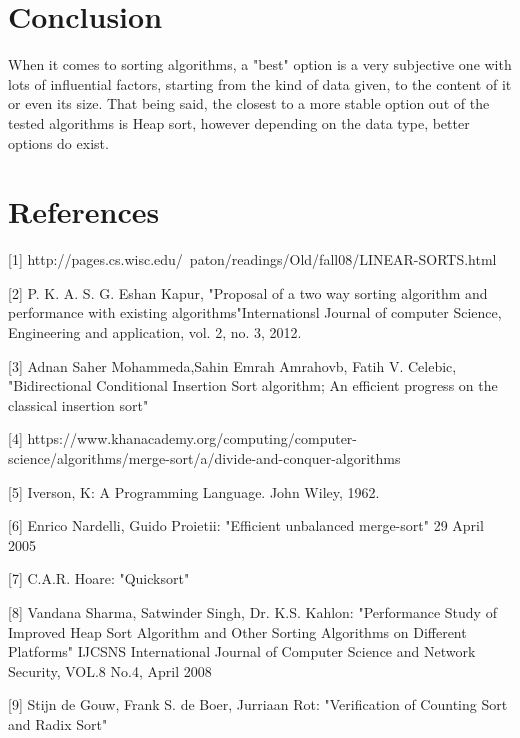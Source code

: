 \documentclass{article}
\begin{document}
\clearpage
\section{Conclusion}
When it comes to sorting algorithms, a "best" option is a very subjective one with lots of influential factors, starting from the kind of data given, to the content of it or even its size. That being said, the closest to a more stable option out of the tested algorithms is Heap sort, however depending on the data type, better options do exist.

\section{References}
[1] http://pages.cs.wisc.edu/~paton/readings/Old/fall08/LINEAR-SORTS.html


[2] P. K. A. S. G. Eshan Kapur, "Proposal of a two way sorting algorithm and performance with existing algorithms"Internationsl Journal of computer Science, Engineering and application, vol. 2, no. 3, 2012.


[3] Adnan Saher Mohammeda,Sahin Emrah Amrahovb, Fatih V. Celebic, "Bidirectional Conditional Insertion Sort algorithm; An efficient progress on the classical insertion sort"


[4] https://www.khanacademy.org/computing/computer-science/algorithms/merge-sort/a/divide-and-conquer-algorithms


[5] Iverson, K: A Programming Language. John Wiley, 1962.


[6] Enrico Nardelli, Guido Proietii: "Efficient unbalanced merge-sort" 29 April 2005


[7] C.A.R. Hoare: "Quicksort"


[8] Vandana Sharma, Satwinder Singh, Dr. K.S. Kahlon: "Performance Study of Improved Heap Sort Algorithm and
Other Sorting Algorithms on Different Platforms" IJCSNS International Journal of Computer Science and Network Security, VOL.8 No.4, April 2008


[9] Stijn de Gouw, Frank S. de Boer, Jurriaan Rot: "Verification of Counting Sort and Radix Sort"
\end{document}
